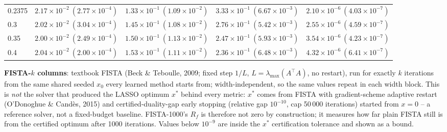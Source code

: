 \begin{table}[htbp]
\begin{tabular}{@{} l rrrr @{}}
0.2375 & $2.17\!\times\!10^{-2}\ (2.77\!\times\!10^{-4})$ & $1.33\!\times\!10^{-1}\ (1.09\!\times\!10^{-2})$ & $3.33\!\times\!10^{-1}\ (6.67\!\times\!10^{-3})$ & $2.10\!\times\!10^{-6}\ (4.03\!\times\!10^{-7})$ \\
0.3 & $2.02\!\times\!10^{-2}\ (3.04\!\times\!10^{-4})$ & $1.45\!\times\!10^{-1}\ (1.08\!\times\!10^{-2})$ & $2.76\!\times\!10^{-1}\ (5.42\!\times\!10^{-3})$ & $2.55\!\times\!10^{-6}\ (4.59\!\times\!10^{-7})$ \\
0.35 & $2.00\!\times\!10^{-2}\ (2.49\!\times\!10^{-4})$ & $1.50\!\times\!10^{-1}\ (1.13\!\times\!10^{-2})$ & $2.47\!\times\!10^{-1}\ (5.93\!\times\!10^{-3})$ & $3.54\!\times\!10^{-6}\ (4.23\!\times\!10^{-7})$ \\
0.4 & $2.04\!\times\!10^{-2}\ (2.00\!\times\!10^{-4})$ & $1.53\!\times\!10^{-1}\ (1.11\!\times\!10^{-2})$ & $2.36\!\times\!10^{-1}\ (6.48\!\times\!10^{-3})$ & $4.32\!\times\!10^{-6}\ (6.41\!\times\!10^{-7})$ \\
\bottomrule
\end{tabular}
\vspace{2pt}
\begin{minipage}{\linewidth}\footnotesize
\textbf{FISTA-$k$ columns}: textbook FISTA (Beck \& Teboulle, 2009; fixed step $1/L$, $L = \lambda_{\max}(A^\top A)$, no restart), run for exactly $k$ iterations from the same shared seeded $x_0$ every learned method starts from; width-independent, so the same values repeat in each width block. This is \emph{not} the solver that produced the LASSO optimum $x^*$ behind every metric: $x^*$ comes from FISTA with gradient-scheme adaptive restart (O'Donoghue \& Cand\`es, 2015) and certified-duality-gap early stopping (relative gap $10^{-10}$, cap 50\,000 iterations) started from $x = 0$ -- a reference solver, not a fixed-budget baseline. FISTA-1000's $R_f$ is therefore not zero by construction; it measures how far plain FISTA still is from the certified optimum after 1000 iterations. Values below $10^{-9}$ are inside the $x^*$ certification tolerance and shown as a bound.
\end{minipage}
\end{table}

